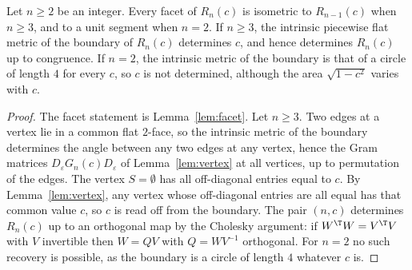 \begin{theorem}\label{thm:main}
Let $n\ge2$ be an integer. Every facet of $R_n(c)$ is isometric to $R_{n-1}(c)$ when $n\ge3$, and to a unit segment when $n=2$.
If $n\ge3$, the intrinsic piecewise flat metric of the boundary of $R_n(c)$ determines $c$, and hence determines $R_n(c)$ up to congruence. If $n=2$, the intrinsic metric of the boundary is that of a circle of length $4$ for every $c$, so $c$ is not determined, although the area $\sqrt{1-c^2}$ varies with $c$.
\end{theorem}
\begin{proof}
The facet statement is Lemma~\ref{lem:facet}.
Let $n\ge3$. Two edges at a vertex lie in a common flat $2$-face, so the intrinsic metric of the boundary determines the angle between any two edges at any vertex, hence the Gram matrices $D_\varepsilon G_n(c)D_\varepsilon$ of Lemma~\ref{lem:vertex} at all vertices, up to permutation of the edges. The vertex $S=\emptyset$ has all off-diagonal entries equal to $c$. By Lemma~\ref{lem:vertex}, any vertex whose off-diagonal entries are all equal has that common value $c$, so $c$ is read off from the boundary. The pair $(n,c)$ determines $R_n(c)$ up to an orthogonal map by the Cholesky argument: if $W^\T W=V^\T V$ with $V$ invertible then $W=QV$ with $Q=WV^{-1}$ orthogonal. For $n=2$ no such recovery is possible, as the boundary is a circle of length $4$ whatever $c$ is.
\end{proof}
